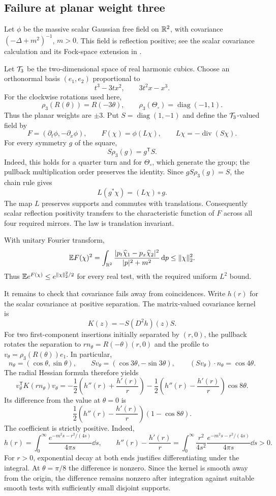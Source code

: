 \subsection{Failure at planar weight three}

Let $\phi$ be the massive scalar Gaussian free field on $\mathbb{R}^2$,
with covariance $(-\Delta+m^2)^{-1}$, $m>0$. This field is reflection
positive; see the scalar covariance calculation and its Fock-space
extension in \cite[pp.~119--120]{Uhl79}.

Let $\mathcal{T}_3$ be the two-dimensional space of real harmonic cubics.
Choose an orthonormal basis $(e_1,e_2)$ proportional to
\[
 t^3-3tx^2,\qquad 3t^2x-x^3.
\]
For the clockwise rotations used here,
\[
 \rho_3(R(\theta))=R(-3\theta),\qquad
 \rho_3(\Theta_\circ)=\operatorname{diag}(-1,1).
\]
Thus the planar weights are $\pm3$. Put $S=\operatorname{diag}(1,-1)$
and define the $\mathcal{T}_3$-valued field by
\[
 F=(\partial_t\phi,-\partial_x\phi),\qquad
 F(\chi)=\phi(L\chi),\qquad L\chi=-\operatorname{div}(S\chi).
\]
For every symmetry $g$ of the square,
\[
 S\rho_3(g)=g^{\mathsf T}S.
\]
Indeed, this holds for a quarter turn and for $\Theta_\circ$, which
generate the group; the pullback multiplication order preserves the
identity. Since $gS\rho_3(g)=S$, the chain rule gives
\[
 L(g^*\chi)=(L\chi)\circ g.
\]
The map $L$ preserves supports and commutes with translations.
Consequently scalar reflection positivity transfers to the
characteristic function of $F$ across all four required mirrors.
The law is translation invariant.

With unitary Fourier transform,
\[
 \mathbb{E} F(\chi)^2
 =\int_{\mathbb{R}^2}
 \frac{|p_t\widehat\chi_1-p_x\widehat\chi_2|^2}
 {|p|^2+m^2}\,\mathrm{d} p
 \leq\|\chi\|_2^2.
\]
Thus $\mathbb{E} e^{F(\chi)}\leq e^{\|\chi\|_2^2/2}$ for every real
test, with the required uniform $L^2$ bound.

It remains to check that covariance fails away from coincidences.
Write $h(r)$ for the scalar covariance at positive separation. The
matrix-valued covariance kernel is
\[
 K(z)=-S(D^2h)(z)S.
\]
For two first-component insertions initially separated by $(r,0)$,
the pullback rotates the separation to $r n_\theta=R(-\theta)(r,0)$
and the profile to $v_\theta=\rho_3(R(\theta))e_1$. In particular,
\[
 n_\theta=(\cos\theta,\sin\theta),\qquad
 S v_\theta=(\cos3\theta,-\sin3\theta),\qquad
 (S v_\theta)\cdot n_\theta=\cos4\theta.
\]
The radial Hessian formula therefore yields
\[
 v_\theta^{\mathsf T}K(rn_\theta)v_\theta
 =-\frac12\left(h''(r)+\frac{h'(r)}r\right)
  -\frac12\left(h''(r)-\frac{h'(r)}r\right)\cos8\theta.
\]
Its difference from the value at $\theta=0$ is
\[
 \frac12\left(h''(r)-\frac{h'(r)}r\right)(1-\cos8\theta).
\]
The coefficient is strictly positive. Indeed,
\[
 h(r)=\int_0^\infty
       \frac{e^{-m^2s-r^2/(4s)}}{4\pi s}\dd s,
 \qquad
 h''(r)-\frac{h'(r)}r
 =\int_0^\infty\frac{r^2}{4s^2}
       \frac{e^{-m^2s-r^2/(4s)}}{4\pi s}\dd s>0.
\]
For $r>0$, exponential decay at both ends justifies differentiating
under the integral. At $\theta=\pi/8$ the difference is nonzero.
Since the kernel is smooth away from the origin, the difference
remains nonzero after integration against suitable smooth tests
with sufficiently small disjoint supports.

